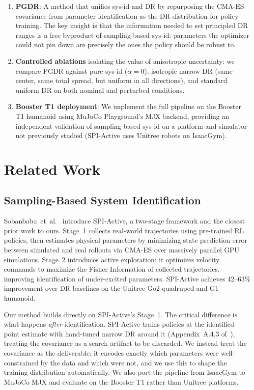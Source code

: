 \documentclass[10pt,twocolumn]{article}
\begin{document}
\begin{enumerate}
    \item \textbf{PGDR}: A method that unifies sys-id and DR by repurposing the CMA-ES covariance from parameter identification as the DR distribution for policy training.
    The key insight is that the information needed to set principled DR ranges is a free byproduct of sampling-based sys-id: parameters the optimizer could not pin down are precisely the ones the policy should be robust to.
    \item \textbf{Controlled ablations} isolating the value of anisotropic uncertainty: we compare PGDR against pure sys-id ($\alpha=0$), isotropic narrow DR (same center, same total spread, but uniform in all directions), and standard uniform DR on both nominal and perturbed conditions.
    \item \textbf{Booster T1 deployment}: We implement the full pipeline on the Booster T1 humanoid using MuJoCo Playground's MJX backend, providing an independent validation of sampling-based sys-id on a platform and simulator not previously studied (SPI-Active uses Unitree robots on IsaacGym).
\end{enumerate}

\section{Related Work}

\subsection{Sampling-Based System Identification}

Sobanbabu~et~al.~\cite{sobanbabu2025spiactive} introduce SPI-Active, a two-stage framework and the closest prior work to ours.
Stage~1 collects real-world trajectories using pre-trained RL policies, then estimates physical parameters by minimizing state prediction error between simulated and real rollouts via CMA-ES over massively parallel GPU simulations.
Stage~2 introduces active exploration: it optimizes velocity commands to maximize the Fisher Information of collected trajectories, improving identification of under-excited parameters.
SPI-Active achieves 42--63\% improvement over DR baselines on the Unitree Go2 quadruped and G1 humanoid.

Our method builds directly on SPI-Active's Stage~1.
The critical difference is what happens \emph{after} identification.
SPI-Active trains policies at the identified point estimate with hand-tuned narrow DR around it (Appendix~A.4.3 of~\cite{sobanbabu2025spiactive}), treating the covariance as a search artifact to be discarded.
We instead treat the covariance as the deliverable: it encodes exactly which parameters were well-constrained by the data and which were not, and we use this to shape the training distribution automatically.
We also port the pipeline from IsaacGym to MuJoCo MJX and evaluate on the Booster T1 rather than Unitree platforms.
\end{document}
